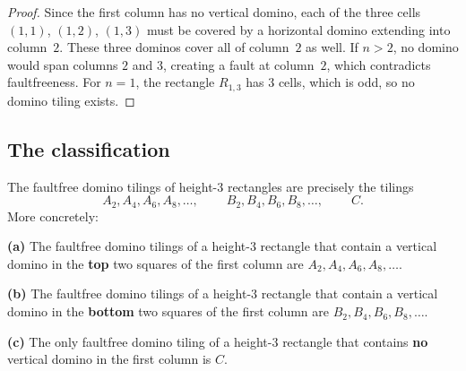 \begin{proof}
\leanok
Since the first column has no vertical domino, each of the three cells
$(1,1)$, $(1,2)$, $(1,3)$ must be covered by a horizontal domino
extending into column~$2$. These three dominos cover all of column~$2$ as
well. If $n > 2$, no domino would span columns $2$ and $3$, creating a
fault at column~$2$, which contradicts faultfreeness.
For $n = 1$, the rectangle $R_{1,3}$ has $3$ cells, which is odd,
so no domino tiling exists.
\end{proof}

\subsection{The classification}

\begin{proposition}
\label{prop.gf.weighted-set.domino.Rn3.ABC}
\leantarget
\leanok
The faultfree domino tilings of
height-$3$ rectangles are precisely the tilings%
\[
A_{2},A_{4},A_{6},A_{8},\ldots,\ \ \ \ \ \ \ \ \ \ B_{2},B_{4},B_{6}%
,B_{8},\ldots,\ \ \ \ \ \ \ \ \ \ C.
\]
More concretely: \medskip

\textbf{(a)} The faultfree domino tilings of a height-$3$ rectangle that
contain a vertical domino in the \textbf{top} two squares of the first column
are $A_{2},A_{4},A_{6},A_{8},\ldots$. \medskip

\textbf{(b)} The faultfree domino tilings of a height-$3$ rectangle that
contain a vertical domino in the \textbf{bottom} two squares of the first
column are $B_{2},B_{4},B_{6},B_{8},\ldots$. \medskip

\textbf{(c)} The only faultfree domino tiling of a height-$3$ rectangle that
contains \textbf{no} vertical domino in the first column is $C$.
\end{proposition}

